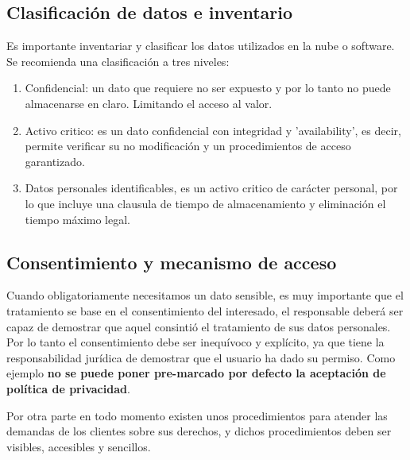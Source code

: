 \subsection{Clasificación de datos e inventario}
Es importante inventariar y clasificar los datos utilizados en la nube o software. Se recomienda una clasificación a tres niveles:
\begin{enumerate}
    \item Confidencial: un dato que requiere no ser expuesto y por lo tanto no puede almacenarse en claro. Limitando el acceso al valor.
    \item Activo critico: es un dato confidencial con integridad y 'availability', es decir, permite verificar su no modificación y un procedimientos de acceso garantizado.
    \item Datos personales identificables, es un activo critico de carácter personal, por lo que incluye una clausula de tiempo de almacenamiento y eliminación el tiempo máximo legal.
\end{enumerate}

\subsection{Consentimiento y mecanismo de acceso}
Cuando obligatoriamente necesitamos un dato sensible, es muy importante que el tratamiento se base en el consentimiento del interesado, el responsable deberá ser capaz de demostrar que aquel consintió el tratamiento de sus datos personales. Por lo tanto el consentimiento debe ser inequívoco y explícito, ya que tiene la responsabilidad jurídica de demostrar que el usuario ha dado su permiso. Como ejemplo \textbf{no se puede poner pre-marcado por defecto la aceptación de política de privacidad}.

Por otra parte en todo momento existen unos procedimientos\cite{c_aedp} para atender las demandas de los clientes sobre sus derechos, y dichos procedimientos deben ser visibles, accesibles y sencillos.